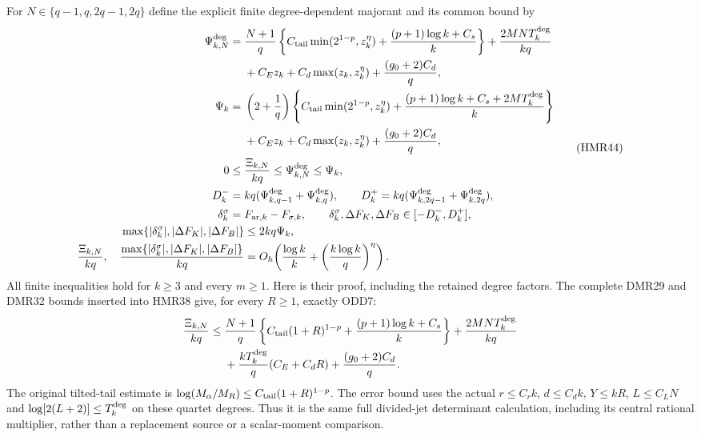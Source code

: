 \documentclass[11pt,a4paper]{article}
\begin{document}
For $N\in\{q-1,q,2q-1,2q\}$ define the explicit finite
degree-dependent majorant and its common bound by
\[
\begin{aligned}
 \Psi_{k,N}^{\rm deg}={}&\frac{N+1}{q}
 \left\{C_{\rm tail}\min(2^{1-p},z_k^\eta)
       +\frac{(p+1)\log k+C_s}{k}\right\}
       +\frac{2MN T_k^{\rm deg}}{kq}\\
 &+C_Ez_k+C_d\max(z_k,z_k^\eta)
                     +\frac{(g_0+2)C_d}{q},\\
 \Psi_k={}&\left(2+\frac1q\right)
 \left\{C_{\rm tail}\min(2^{1-p},z_k^\eta)
       +\frac{(p+1)\log k+C_s+2MT_k^{\rm deg}}{k}\right\}\\
 &+C_Ez_k+C_d\max(z_k,z_k^\eta)
                     +\frac{(g_0+2)C_d}{q},\\
 0\leq{}&\frac{\Xi_{k,N}}{kq}
        \leq\Psi_{k,N}^{\rm deg}\leq\Psi_k,\\
 D_k^-={}&kq(\Psi_{k,q-1}^{\rm deg}+\Psi_{k,q}^{\rm deg}),\qquad
 D_k^+=kq(\Psi_{k,2q-1}^{\rm deg}+\Psi_{k,2q}^{\rm deg}),\\
 \delta_k^\sigma={}&F_{\mathrm{ar},k}-F_{\sigma,k},\qquad
 \delta_k^\sigma,\Delta F_K,\Delta F_B\in[-D_k^-,D_k^+],\\
 \max\{|\delta_k^\sigma|,|\Delta F_K|,|\Delta F_B|\}
 &\leq2kq\Psi_k,\\
 \frac{\Xi_{k,N}}{kq},\quad
 \frac{\max\{|\delta_k^\sigma|,|\Delta F_K|,|\Delta F_B|\}}{kq}
 & =O_h\!\left(\frac{\log k}{k}
                 +\left(\frac{k\log k}{q}\right)^\eta\right).
\end{aligned}\tag{HMR44}
\]
All finite inequalities hold for $k\geq3$ and every $m\geq1$.
Here is their proof, including the retained degree factors.
The complete DMR29 and DMR32 bounds inserted into HMR38 give,
for every $R\geq1$, exactly ODD7:
\[
\begin{aligned}
 \frac{\Xi_{k,N}}{kq}\leq{}&\frac{N+1}{q}
 \left\{C_{\rm tail}(1+R)^{1-p}
                 +\frac{(p+1)\log k+C_s}{k}\right\}
            +\frac{2MN T_k^{\rm deg}}{kq}\\
 &+\frac{kT_k^{\rm deg}}q(C_E+C_dR)
                     +\frac{(g_0+2)C_d}{q}.
\end{aligned}
\]
The original tilted-tail estimate is
$\log(M_\alpha/M_R)\leq C_{\rm tail}(1+R)^{1-p}$.
The error bound uses the actual $r\leq C_rk$,
$d\leq C_dk$, $Y\leq kR$, $L\leq C_LN$ and
$\log[2(L+2)]\leq T_k^{\rm deg}$ on these quartet degrees.
Thus it is the same full divided-jet determinant calculation,
including its central rational multiplier, rather than a
replacement source or a scalar-moment comparison.
\end{document}
